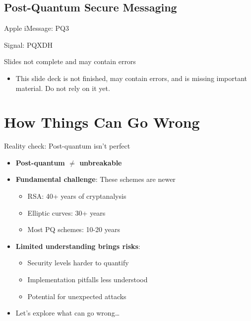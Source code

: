 \documentclass[aspectratio=169, lualatex, handout]{beamer}
\begin{document}

\subsection{Post-Quantum Secure Messaging}
\begin{frame}{Apple iMessage: PQ3}
\end{frame}

\begin{frame}{Signal: PQXDH}
\end{frame}


\begin{frame}{Slides not complete and may contain errors}
	\begin{itemize}
		\item This slide deck is not finished, may contain errors, and is missing important material. Do not rely on it yet.
	\end{itemize}
\end{frame}

\section{How Things Can Go Wrong}

\begin{frame}{Reality check: Post-quantum isn't perfect}
	\begin{itemize}
		\item \textbf{Post-quantum $\neq$ unbreakable}
		\item \textbf{Fundamental challenge}: These schemes are newer
		      \begin{itemize}
			      \item RSA: 40+ years of cryptanalysis
			      \item Elliptic curves: 30+ years
			      \item Most PQ schemes: 10-20 years
		      \end{itemize}
		\item \textbf{Limited understanding brings risks}:
		      \begin{itemize}
			      \item Security levels harder to quantify
			      \item Implementation pitfalls less understood
			      \item Potential for unexpected attacks
		      \end{itemize}
		\item Let's explore what can go wrong\ldots
	\end{itemize}
\end{frame}
\end{document}
